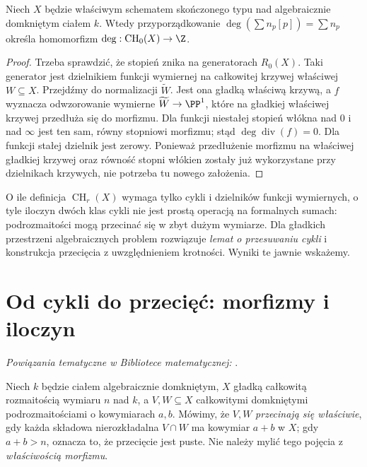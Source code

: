 \begin{stwierdzenie}
\label{st:ga7-degree}
Niech $X$ będzie właściwym schematem skończonego typu nad
algebraicznie domkniętym ciałem $k$. Wtedy przyporządkowanie
$\deg(\sum n_p[p])=\sum n_p$ określa homomorfizm
$\deg:\operatorname{CH}_0(X)\to\Z$.
\end{stwierdzenie}
\begin{proof}
Trzeba sprawdzić, że stopień znika na generatorach
$R_0(X)$. Taki generator jest dzielnikiem funkcji
wymiernej na całkowitej krzywej właściwej $W\subseteq X$.
Przejdźmy do normalizacji $\widetilde W$.
Jest ona gładką właściwą krzywą, a $f$ wyznacza
odwzorowanie wymierne $\widetilde W\to\PP^1$, które
na gładkiej właściwej krzywej przedłuża się do morfizmu.
Dla funkcji niestałej stopień włókna nad $0$
i nad $\infty$ jest ten sam, równy stopniowi morfizmu;
stąd $\deg\operatorname{div}(f)=0$. Dla funkcji stałej
dzielnik jest zerowy. Ponieważ przedłużenie morfizmu
na właściwej gładkiej krzywej oraz równość stopni włókien
zostały już wykorzystane przy dzielnikach krzywych,
nie potrzeba tu nowego założenia.
\end{proof}

\begin{uwaga}
O ile definicja $\operatorname{CH}_r(X)$ wymaga tylko
cykli i dzielników funkcji wymiernych, o tyle iloczyn dwóch
klas cykli nie jest prostą operacją na formalnych sumach:
podrozmaitości mogą przecinać się w zbyt dużym wymiarze.
Dla gładkich przestrzeni algebraicznych problem rozwiązuje
\emph{lemat o przesuwaniu cykli} i konstrukcja przecięcia
z uwzględnieniem krotności. Wyniki te jawnie wskażemy.
\end{uwaga}

\section{Od cykli do przecięć: morfizmy i iloczyn}
\label{sec:ga7-intersection}

\noindent\emph{Powiązania tematyczne w Bibliotece matematycznej:} .


\begin{definicja}
\label{def:ga7-proper-intersection}
Niech $k$ będzie ciałem algebraicznie domkniętym,
$X$ gładką całkowitą rozmaitością wymiaru $n$ nad $k$,
a $V,W\subseteq X$ całkowitymi domkniętymi podrozmaitościami
o kowymiarach $a,b$. Mówimy, że $V,W$ \emph{przecinają się
właściwie}, gdy każda składowa nierozkładalna $V\cap W$
ma kowymiar $a+b$ w $X$; gdy $a+b>n$, oznacza to, że
przecięcie jest puste.
Nie należy mylić tego pojęcia z \emph{właściwością morfizmu}.
\end{definicja}

